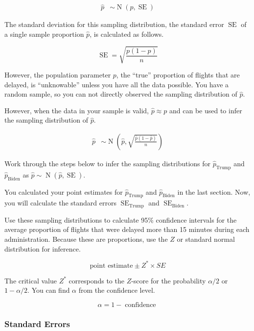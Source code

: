 \documentclass[
  letterpaper,
  DIV=11,
  numbers=noendperiod]{scrartcl}
\begin{document}
\[
\begin{aligned}
\hat{p} &\sim \operatorname{N}\left(p, \operatorname{SE}\right)
\end{aligned}
\]

The standard deviation for this sampling distribution, the standard
error \(\operatorname{SE}\) of a single sample proportion \(\hat{p}\),
is calculated as follows.

\[
\operatorname{SE}=\sqrt{\frac{p(1-p)}{n}}
\]

However, the population parameter \(p\), the ``true'' proportion of
flights that are delayed, is ``unknowable'' unless you have all the data
possible. You have a random sample, so you can not directly observed the
sampling distribution of \(\hat{p}\).

However, when the data in your sample is valid, \(\hat{p} \approx p\)
and can be used to infer the sampling distribution of \(\hat{p}\).

\[
\begin{aligned}
\hat{p} &\sim \operatorname{N}\left(\hat{p}, \sqrt{\frac{\hat{p}(1-\hat{p})}{n}}\right)
\end{aligned}
\]

Work through the steps below to infer the sampling distributions for
\(\hat{p}_{\text{Trump}}\) and \(\hat{p}_{\text{Biden}}\) as
\(\hat{p} \sim \operatorname{N}\left(\hat{p}, \operatorname{SE}\right)\).

You calculated your point estimates for \(\hat{p}_{\text{Trump}}\) and
\(\hat{p}_{\text{Biden}}\) in the last section. Now, you will calculate
the standard errors \(\operatorname{SE}_{\text{Trump}}\) and
\(\operatorname{SE}_{\text{Biden}}\).

Use these sampling distributions to calculate 95\% confidence intervals
for the average proportion of flights that were delayed more than 15
minutes during each administration. Because these are proportions, use
the \(Z\) or standard normal distribution for inference.

\[
\text{point estimate} \pm Z^* \times SE
\]

The critical value \(Z^*\) corresponds to the \(Z\)-score for the
probability \(\alpha/2\) or \(1-\alpha/2\). You can find \(\alpha\) from
the confidence level.

\[
\alpha=1-\operatorname{confidence}
\]

\subsubsection{Standard Errors}\label{standard-errors}
\end{document}
